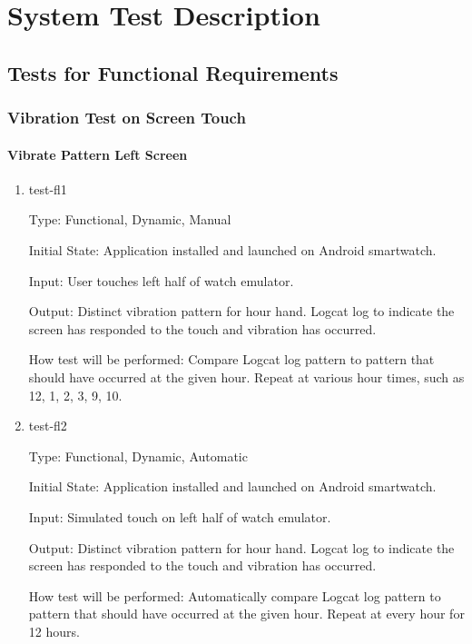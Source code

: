 \section{System Test Description}
	
\subsection{Tests for Functional Requirements}

\subsubsection{Vibration Test on Screen Touch}
		
\paragraph{Vibrate Pattern Left Screen}

\begin{enumerate}

\item{test-fl1\\}

Type: Functional, Dynamic, Manual
					
Initial State: Application installed and launched on Android smartwatch. 
					
Input: User touches left half of watch emulator.
					
Output: Distinct vibration pattern for hour hand. Logcat log to indicate the screen has responded to the touch and vibration has occurred.  
					
How test will be performed: Compare Logcat log pattern to pattern that should have occurred at the given hour. Repeat at various hour times, such as 12, 1, 2, 3, 9, 10. 
					
\item{test-fl2\\}

Type: Functional, Dynamic, Automatic
					
Initial State: Application installed and launched on Android smartwatch. 
					
Input: Simulated touch on left half of watch emulator.
					
Output: Distinct vibration pattern for hour hand. Logcat log to indicate the screen has responded to the touch and vibration has occurred.  
					
How test will be performed: Automatically compare Logcat log pattern to pattern that should have occurred at the given hour. Repeat at every hour for 12 hours.

\end{enumerate}
